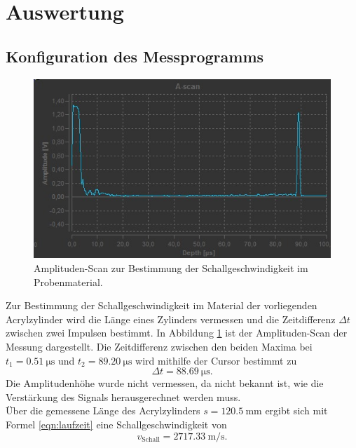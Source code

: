 \section{Auswertung}
\label{sec:Auswertung}

\subsection{Konfiguration des Messprogramms}
\begin{figure}
  \centering
  \includegraphics{Messdaten/a.jpg}
  \caption{Amplituden-Scan zur Bestimmung der Schallgeschwindigkeit im Probenmaterial.}
  \label{fig:a1}
\end{figure}
Zur Bestimmung der Schallgeschwindigkeit im Material der vorliegenden Acrylzylinder wird die Länge eines Zylinders vermessen und die Zeitdifferenz $\Delta t$ zwischen zwei Impulsen bestimmt.
In Abbildung \ref{fig:a1} ist der Amplituden-Scan der Messung dargestellt.
Die Zeitdifferenz zwischen den beiden Maxima bei $t_1=\SI{0.51}{\micro\second}$ und $t_2=\SI{89.20}{\micro\second}$ wird mithilfe der Cursor bestimmt zu
\begin{equation}
  \Delta t=\SI{88.69}{\micro\second} \text{.}
\end{equation}
Die Amplitudenhöhe wurde nicht vermessen, da nicht bekannt ist, wie die Verstärkung des Signals herausgerechnet werden muss.\\
Über die gemessene Länge des Acrylzylinders $s=\SI{120.5}{\milli\meter}$ ergibt sich mit Formel \eqref{eqn:laufzeit} eine Schallgeschwindigkeit von
\begin{equation}
  v_{\mathrm{Schall}}=\SI{2717.33}{\meter\per\second} \text{.}
\end{equation}
